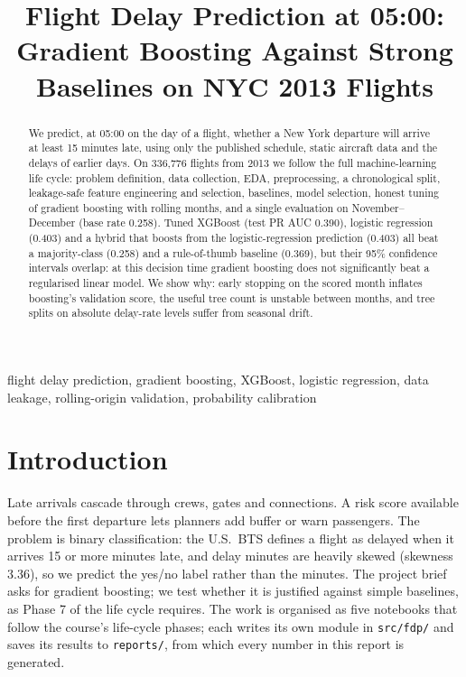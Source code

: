 \documentclass[conference]{IEEEtran}
\begin{document}
\title{Flight Delay Prediction at 05:00: Gradient Boosting Against Strong Baselines on NYC 2013 Flights}
\author{
}
\maketitle

\begin{abstract}
We predict, at 05:00 on the day of a flight, whether a New York departure will arrive at least 15 minutes late, using only the published schedule, static aircraft data and the delays of earlier days. On 336,776 flights from 2013 we follow the full machine-learning life cycle: problem definition, data collection, EDA, preprocessing, a chronological split, leakage-safe feature engineering and selection, baselines, model selection, honest tuning of gradient boosting with rolling months, and a single evaluation on November--December (base rate 0.258). Tuned XGBoost (test PR AUC 0.390), logistic regression (0.403) and a hybrid that boosts from the logistic-regression prediction (0.403) all beat a majority-class (0.258) and a rule-of-thumb baseline (0.369), but their 95\% confidence intervals overlap: at this decision time gradient boosting does not significantly beat a regularised linear model. We show why: early stopping on the scored month inflates boosting's validation score, the useful tree count is unstable between months, and tree splits on absolute delay-rate levels suffer from seasonal drift.
\end{abstract}

\begin{IEEEkeywords}
flight delay prediction, gradient boosting, XGBoost, logistic regression, data leakage, rolling-origin validation, probability calibration
\end{IEEEkeywords}

\section{Introduction}
Late arrivals cascade through crews, gates and connections. A risk score available before the first departure lets planners add buffer or warn passengers. The problem is binary classification: the U.S.\ BTS defines a flight as delayed when it arrives 15 or more minutes late, and delay minutes are heavily skewed (skewness 3.36), so we predict the yes/no label rather than the minutes. The project brief asks for gradient boosting; we test whether it is justified against simple baselines, as Phase 7 of the life cycle requires. The work is organised as five notebooks that follow the course's life-cycle phases; each writes its own module in \texttt{src/fdp/} and saves its results to \texttt{reports/}, from which every number in this report is generated.
\end{document}
